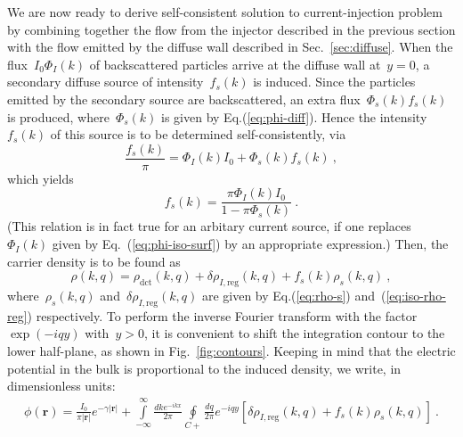 \documentclass[preprint,aps,eqsecnum, prb]{revtex4-1}
\newcommand{\dct}[1]{{#1}_\mathrm{dct}}
\begin{document}
We are now ready to derive self-consistent solution to current-injection
problem by combining together the flow from the injector described in the
previous section with the flow emitted by the diffuse wall described in
Sec.~\ref{sec:diffuse}. When the flux~$I_0 \Phi_I(k)$ of
backscattered particles arrive at the diffuse wall at~$y = 0$,
a secondary diffuse source of intensity~$f_s(k)$
is induced. Since the particles emitted by the secondary source
are backscattered, an extra flux~$\Phi_s(k) f_s(k)$ is produced,
where~$\Phi_s(k)$ is given by Eq.(\ref{eq:phi-diff}).
Hence  the intensity~$f_{s}(k)$ of this source is to be determined
self-consistently, via
\begin{equation}
  \frac{f_s(k)}{\pi} = \Phi_I(k) I_0 + \Phi_s(k) f_{s}(k)
  \ ,
\end{equation}
which yields
\begin{equation}
  \label{eq:fs}
  f_{s}(k) = \frac{\pi \Phi_I(k) I_0}{1 - \pi \Phi_s(k)}
  \ .
\end{equation}
(This relation is in fact true for an arbitary current source,
if one replaces~$\Phi_I(k)$ given by Eq.~(\ref{eq:phi-iso-surf})
by an appropriate expression.)
Then, the carrier density is to be found as
\begin{equation}
  \rho(k, q) =\dct{\rho}(k, q) + \delta\rho_{I,\mathrm{reg}}(k, q)
  + f_{s}(k) \rho_{s}(k, q)
  \ ,
\end{equation}
where~$\rho_{s}(k, q)$ and~$\delta\rho_{I,\mathrm{reg}}(k, q)$
are given by Eq.(\ref{eq:rho-s})
and~(\ref{eq:iso-rho-reg}) respectively. To perform the inverse
Fourier transform with the factor~$\exp(-i q y)$ with~$y > 0$,
it is convenient to shift the integration contour
to the lower half-plane, as shown in Fig.~\ref{fig:contours}.
Keeping in mind that the electric potential in the bulk is
proportional to the induced density, we write, in dimensionless
units:
\begin{align}
  \label{eq:rho-final}
  \phi({\bm r}) = \frac{I_0}{\pi |{\bm r}|} e^{-\gamma |{\bm r}|}
  + \int\limits_{-\infty}^{\infty} \frac{dk e^{-ikx}}{2\pi}
  \oint\limits_{C+} \frac{dq}{2\pi} e^{-iqy}
  \left[\delta\rho_{I, \mathrm{reg}}(k, q)
  + f_s(k) \rho_{s}(k, q) \right]\ .
\end{align}
\end{document}
